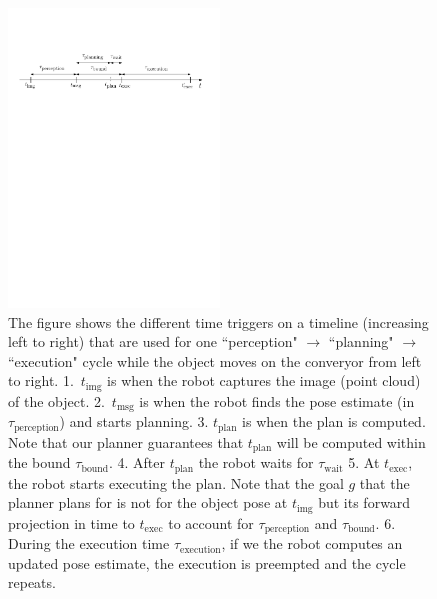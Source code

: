 \begin{figure}
    \centering
    \includegraphics[width=0.5\textwidth]{figs/timeline.pdf}
    \caption{The figure shows the different time triggers on a timeline (increasing left to right) that are used for one ``perception" $\rightarrow$ ``planning" $\rightarrow$ ``execution" cycle while the object moves on the converyor from left to right.
    1.~$t_{\textrm{img}}$ is when the robot captures the image (point cloud) of the object. 
    2.~$t_{\textrm{msg}}$ is when the robot finds the pose estimate (in $\tau_{\textrm{perception}}$) and starts planning. 
    3. $t_{\textrm{plan}}$ is when the plan is computed. Note that our planner guarantees that $t_{\textrm{plan}}$ will be computed within the bound $\tau_{\textrm{bound}}$. 
    4. After $t_{\textrm{plan}}$ the robot waits for $\tau_{\textrm{wait}}$
    5. At $t_{\textrm{exec}}$, the robot starts executing the plan. Note that the goal $g$ that the planner plans for is not for the object pose at $t_{\textrm{img}}$ but its forward projection in time to $t_{\textrm{exec}}$ to account for $\tau_{\textrm{perception}}$ and $\tau_{\textrm{bound}}$.
    6. During the execution time $\tau_{\textrm{execution}}$, if we the robot computes an updated pose estimate, the execution is preempted and the cycle repeats.
    }
    \label{fig:tl}
\end{figure}

